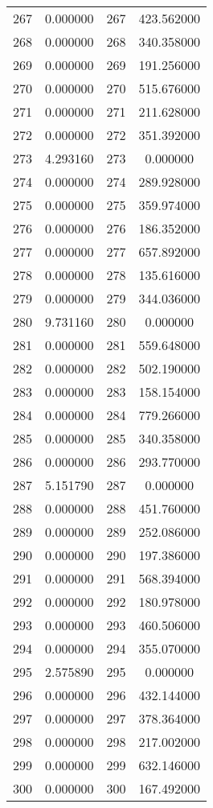 \documentclass[12pt]{article}
\begin{document}
\begin{longtable}{@{}cccc@{}}
267 & 0.000000 & 267 & 423.562000 \\
268 & 0.000000 & 268 & 340.358000 \\
269 & 0.000000 & 269 & 191.256000 \\
270 & 0.000000 & 270 & 515.676000 \\
271 & 0.000000 & 271 & 211.628000 \\
272 & 0.000000 & 272 & 351.392000 \\
273 & 4.293160 & 273 & 0.000000 \\
274 & 0.000000 & 274 & 289.928000 \\
275 & 0.000000 & 275 & 359.974000 \\
276 & 0.000000 & 276 & 186.352000 \\
277 & 0.000000 & 277 & 657.892000 \\
278 & 0.000000 & 278 & 135.616000 \\
279 & 0.000000 & 279 & 344.036000 \\
280 & 9.731160 & 280 & 0.000000 \\
281 & 0.000000 & 281 & 559.648000 \\
282 & 0.000000 & 282 & 502.190000 \\
283 & 0.000000 & 283 & 158.154000 \\
284 & 0.000000 & 284 & 779.266000 \\
285 & 0.000000 & 285 & 340.358000 \\
286 & 0.000000 & 286 & 293.770000 \\
287 & 5.151790 & 287 & 0.000000 \\
288 & 0.000000 & 288 & 451.760000 \\
289 & 0.000000 & 289 & 252.086000 \\
290 & 0.000000 & 290 & 197.386000 \\
291 & 0.000000 & 291 & 568.394000 \\
292 & 0.000000 & 292 & 180.978000 \\
293 & 0.000000 & 293 & 460.506000 \\
294 & 0.000000 & 294 & 355.070000 \\
295 & 2.575890 & 295 & 0.000000 \\
296 & 0.000000 & 296 & 432.144000 \\
297 & 0.000000 & 297 & 378.364000 \\
298 & 0.000000 & 298 & 217.002000 \\
299 & 0.000000 & 299 & 632.146000 \\
300 & 0.000000 & 300 & 167.492000 \\

\end{longtable}
\end{document}
